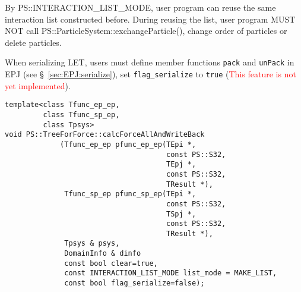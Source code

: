 \begin{itemize}
By PS::INTERACTION\_LIST\_MODE, user program can reuse the same interaction list constructed before. During reusing the list, user program MUST NOT call \newline PS::ParticleSystem::exchangeParticle(), change order of particles or delete particles.

When serializing LET, users must define member functions \texttt{pack} and \texttt{unPack} in EPJ (see \S~\ref{sec:EPJ:serialize}), set \texttt{flag\_serialize} to \texttt{true} (\textcolor{red}{This feature is not yet implemented}).


\end{itemize}

\begin{screen}
\begin{verbatim}
template<class Tfunc_ep_ep,
         class Tfunc_sp_ep,
         class Tpsys>
void PS::TreeForForce::calcForceAllAndWriteBack
             (Tfunc_ep_ep pfunc_ep_ep(TEpi *,
                                      const PS::S32,
                                      TEpj *,
                                      const PS::S32,
                                      TResult *),
              Tfunc_sp_ep pfunc_sp_ep(TEpi *,
                                      const PS::S32,
                                      TSpj *,
                                      const PS::S32,
                                      TResult *),
              Tpsys & psys,
              DomainInfo & dinfo
              const bool clear=true,
              const INTERACTION_LIST_MODE list_mode = MAKE_LIST,
              const bool flag_serialize=false);
\end{verbatim}
\end{screen}


